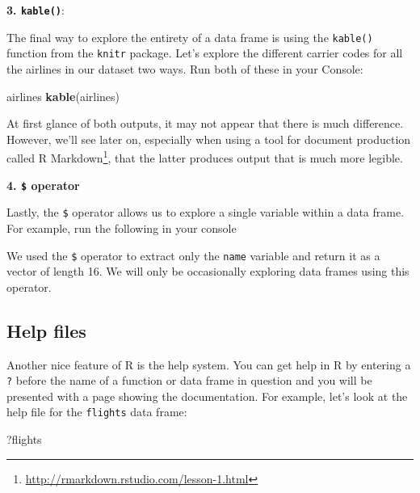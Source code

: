 \documentclass[12pt,]{krantz}
\makeatletter
\newenvironment{Shaded}{\begin{snugshade}}{\end{snugshade}}
\newcommand{\KeywordTok}[1]{\textcolor[rgb]{0.27,0.27,0.27}{\textbf{#1}}}
\newcommand{\OperatorTok}[1]{\textcolor[rgb]{0.43,0.43,0.43}{\textbf{#1}}}
\newcommand{\NormalTok}[1]{#1}
\renewcommand{\href}[2]{#2\footnote{\url{#1}}}
\newenvironment{kframe}{%
\medskip{}
\setlength{\fboxsep}{.8em}
 \def\at@end@of@kframe{}%
 \ifinner\ifhmode%
  \def\at@end@of@kframe{\end{minipage}}%
  \begin{minipage}{\columnwidth}%
 \fi\fi%
 \def\FrameCommand##1{\hskip\@totalleftmargin \hskip-\fboxsep
 \colorbox{shadecolor}{##1}\hskip-\fboxsep
     \hskip-\linewidth \hskip-\@totalleftmargin \hskip\columnwidth}%
 \MakeFramed {\advance\hsize-\width
   \@totalleftmargin\z@ \linewidth\hsize
   \@setminipage}}%
 {\par\unskip\endMakeFramed%
 \at@end@of@kframe}
\renewenvironment{Shaded}{\begin{kframe}}{\end{kframe}}
\theoremstyle{definition}
\theoremstyle{definition}
\theoremstyle{definition}
\theoremstyle{remark}
\makeatother
\begin{document}
\textbf{3. \texttt{kable()}}:

The final way to explore the entirety of a data frame is using the
\texttt{kable()} function from the \texttt{knitr} package. Let's explore
the different carrier codes for all the airlines in our dataset two
ways. Run both of these in your Console:

\begin{Shaded}
\begin{Highlighting}[]
\NormalTok{airlines}
\KeywordTok{kable}\NormalTok{(airlines)}
\end{Highlighting}
\end{Shaded}

At first glance of both outputs, it may not appear that there is much
difference. However, we'll see later on, especially when using a tool
for document production called
\href{http://rmarkdown.rstudio.com/lesson-1.html}{R Markdown}, that the
latter produces output that is much more legible.

\textbf{4. \texttt{\$} operator}

Lastly, the \texttt{\$} operator allows us to explore a single variable
within a data frame. For example, run the following in your console

\begin{Shaded}
\end{Shaded}

We used the \texttt{\$} operator to extract only the \texttt{name}
variable and return it as a vector of length 16. We will only be
occasionally exploring data frames using this operator.

\subsection{Help files}\label{help-files}

Another nice feature of R is the help system. You can get help in R by
entering a \texttt{?} before the name of a function or data frame in
question and you will be presented with a page showing the
documentation. For example, let's look at the help file for the
\texttt{flights} data frame:

\begin{Shaded}
\begin{Highlighting}[]
\NormalTok{?flights}
\end{Highlighting}
\end{Shaded}
\end{document}

